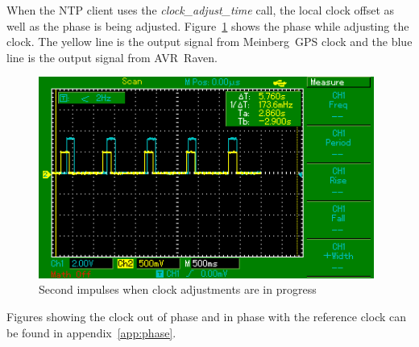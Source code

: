 When the NTP client uses the {\it{clock\_adjust\_time}} call,
the local clock offset as well as the phase is being adjusted.
Figure~\ref{fig:measurements-osc-adjusting-phase} shows the phase while adjusting the clock.
The yellow line is the output signal from Meinberg~GPS clock
and the blue line is the output signal from AVR~Raven.
\begin{figure}[H]
  \centering
  \includegraphics[width=11cm,keepaspectratio]{fig/osc-adjusting-phase.png}
  \caption{Second impulses when clock adjustments are in progress}
  \label{fig:measurements-osc-adjusting-phase}
\end{figure}
Figures showing the clock out of phase and in phase with
the reference clock can be found in appendix~\ref{app:phase}.
